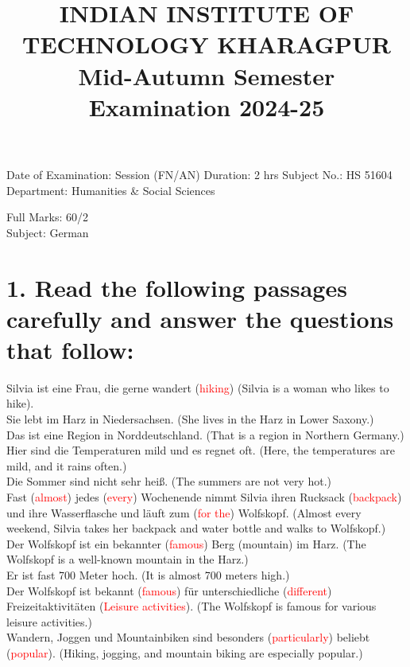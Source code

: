\documentclass{article}
\title{
INDIAN INSTITUTE OF TECHNOLOGY KHARAGPUR \\
Mid-Autumn Semester Examination 2024-25
}
\author{}
\date{}
\begin{document}
\maketitle
\begin{center}
Date of Examination: \hspace{0.5cm} Session (FN/AN) \hspace{0.5cm} Duration: 2 hrs \hspace{0.5cm} Subject No.: HS 51604 \\
Department: Humanities \& Social Sciences
\end{center}

\vspace{0.5cm}
\begin{center}
Full Marks: 60/2 \\
Subject: German
\end{center}

\section*{1. Read the following passages carefully and answer the questions that follow:}

Silvia ist eine Frau, die gerne wandert (\textcolor{red}{hiking}) (Silvia is a woman who likes to hike). \\
Sie lebt im Harz in Niedersachsen. (She lives in the Harz in Lower Saxony.) \\
Das ist eine Region in Norddeutschland. (That is a region in Northern Germany.) \\
Hier sind die Temperaturen mild und es regnet oft. (Here, the temperatures are mild, and it rains often.) \\
Die Sommer sind nicht sehr hei\ss. (The summers are not very hot.) \\

Fast (\textcolor{red}{almost}) jedes (\textcolor{red}{every}) Wochenende nimmt Silvia ihren Rucksack (\textcolor{red}{backpack}) und ihre Wasserflasche und läuft zum (\textcolor{red}{for the}) Wolfskopf. (Almost every weekend, Silvia takes her backpack and water bottle and walks to Wolfskopf.) \\
Der Wolfskopf ist ein bekannter (\textcolor{red}{famous}) Berg (mountain) im Harz. (The Wolfskopf is a well-known mountain in the Harz.) \\
Er ist fast 700 Meter hoch. (It is almost 700 meters high.) \\

Der Wolfskopf ist bekannt (\textcolor{red}{famous}) für unterschiedliche (\textcolor{red}{different}) Freizeitaktivitäten (\textcolor{red}{Leisure activities}). (The Wolfskopf is famous for various leisure activities.) \\
Wandern, Joggen und Mountainbiken sind besonders (\textcolor{red}{particularly}) beliebt (\textcolor{red}{popular}). (Hiking, jogging, and mountain biking are especially popular.) \\
\end{document}
